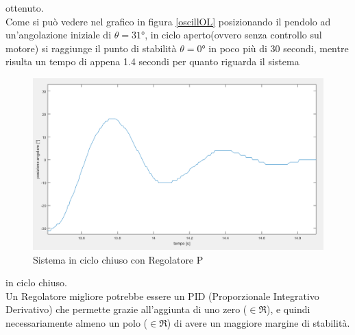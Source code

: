 ottenuto.\\
Come si può vedere nel grafico in figura \ref{oscillOL} posizionando il pendolo ad un'angolazione iniziale di $\theta=\ang{31}$, in ciclo aperto(ovvero senza controllo sul motore) si raggiunge il punto di stabilità $\theta=\ang{0}$ in poco più di 30 secondi, mentre risulta un tempo di appena 1.4 secondi per quanto riguarda il sistema 
\begin{figure}[ht]
	\centering
	\includegraphics[scale=0.402]{oscillCL.PNG}
	\caption{Sistema in ciclo chiuso con Regolatore P}
	\label{oscillCL}
\end{figure}
in ciclo chiuso.\\
Un Regolatore migliore potrebbe essere un PID (Proporzionale Integrativo Derivativo) che permette grazie all'aggiunta di uno zero ($\in\Re$), e quindi necessariamente almeno un polo ($\in\Re$) di avere un maggiore margine di stabilità.
